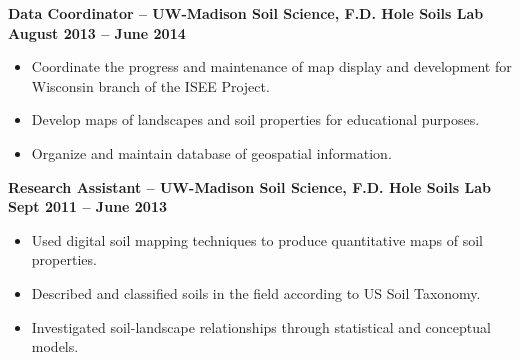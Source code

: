 \documentclass{article}
\begin{document}
\begin{small}
	\noindent \textbf{Data Coordinator -- UW-Madison Soil Science, F.D. Hole Soils Lab} \hfill \textbf{August 2013 -- June 2014}
	\begin{itemize}
		\item Coordinate the progress and maintenance of map display and development for Wisconsin branch of the ISEE Project.
		\item Develop maps of landscapes and soil properties for educational purposes.
		\item Organize and maintain database of geospatial information.
	\end{itemize}
	\noindent \textbf{Research Assistant -- UW-Madison Soil Science, F.D. Hole Soils Lab} \hfill \textbf{Sept 2011 -- June 2013}
	\begin{itemize}
		\item Used digital soil mapping techniques to produce quantitative maps of soil properties.
		\item Described and classified soils in the field according to US Soil Taxonomy.
		\item Investigated soil-landscape relationships through statistical and conceptual models.
	\end{itemize}

\end{small}
\end{document}
